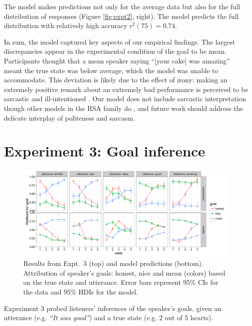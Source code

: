 \documentclass[10pt,letterpaper]{article}
\begin{document}
The model makes predictions not only for the average data but also for the full distribution of responses (Figure \ref{fig:expt2}, right).
The model predicts the full distribution with relatively high accuracy $r^2(75) = 0.74$.

In sum, the model captured key aspects of our empirical findings.
The largest discrepancies appear in the experimental condition of the goal to be mean.
Participants thought that a mean speaker saying ``[your cake] was amazing'' meant the true state was below average, which the model was unable to accommodate.
This deviation is likely due to the effect of irony: making an extremely positive remark about an extremely bad performance is perceived to be sarcastic and ill-intentioned \cite{colston1997}.
Our model does not include sarcastic interpretation though other models in the RSA family do \cite{Kao2015}, and future work should address the delicate interplay of politeness and sarcasm.

\section{Experiment 3: Goal inference}

\begin{figure}[!t]
\begin{center}
  \includegraphics[width=\textwidth]{figures/exp3.pdf}
  \caption{\label{fig:expt3} Results from Expt.~3 (top) and model predictions (bottom). Attribution of speaker's goals: honest, nice and mean (colors) based on the true state and utterance. Error bars represent 95\% CIs for the data and 95\% HDIs for the model.}
  \end{center}
\end{figure}

Experiment 3 probed listeners' inferences of the speaker's goals, given an utterance (e.g. \emph{``It was good''}) and a true state (e.g. 2 out of 5 hearts).
\end{document}
